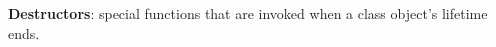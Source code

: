 \documentclass[7pt, twocolumn]{extarticle}
\begin{document}
\begin{small}

\begin{minipage}[h]{4.4cm}
\textbf{Destructors}: special functions that are invoked when a class object's lifetime ends.


\end{minipage}
\end{small}
\end{document}
